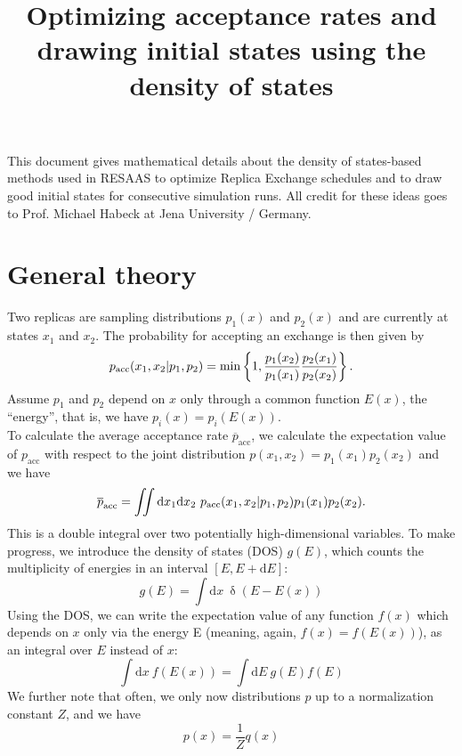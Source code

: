 \documentclass{article}
\title{Optimizing acceptance rates and drawing initial states using the density of states}
\date{}
\renewcommand{\d}{\mathrm{d}}
\begin{document}
\maketitle
This document gives mathematical details about the density of states-based methods used in RESAAS to optimize Replica Exchange schedules and to draw good initial states for consecutive simulation runs. All credit for these ideas goes to Prof. Michael Habeck at Jena University / Germany.
\section*{General theory}
Two replicas are sampling distributions $p_1(x)$ and $p_2(x)$ and are currently at states $x_1$ and $x_2$. The probability for accepting an exchange is then given by
\begin{equation}
  p_{\mathrm{acc}}(x_1, x_2|p_1, p_2) = \mathrm{min}\left\{1, \frac{p_1(x_2)}{p_1(x_1)} \frac{p_2(x_1)}{p_2(x_2)}\right\} \mbox .
\end{equation}
Assume $p_1$ and $p_2$ depend on $x$ only through a common function $E(x)$, the ``energy'', that is, we have $p_i(x)=p_i(E(x))$. \\
To calculate the average acceptance rate $\overline{p}_{\mathrm{acc}}$, we calculate the expectation value of $p_{\mathrm{acc}}$ with respect to the joint distribution $p(x_1, x_2)=p_1(x_1)p_2(x_2)$ and we have
\begin{equation}
  \overline{p}_{\mathrm{acc}} = \iint \d x_1 \d x_2 \ p_{\mathrm{acc}}(x_1, x_2|p_1, p_2) p_1(x_1)p_2(x_2) \mbox .
\end{equation}
This is a double integral over two potentially high-dimensional variables. To make progress, we introduce the density of states (DOS) $g(E)$, which counts the multiplicity of energies in an interval $[E, E + \d E]$:
\begin{equation*}
  g(E) = \int \d x \ \updelta(E-E(x))
\end{equation*}
Using the DOS, we can write the expectation value of any function $f(x)$ which depends on $x$ only via the energy E (meaning, again, $f(x)=f(E(x))$), as an integral over $E$ instead of $x$:
\begin{equation*}
  \int \d x \ f(E(x)) = \int \d E \ g(E) f(E)
\end{equation*}
We further note that often, we only now distributions $p$ up to a normalization constant $Z$, and we have
\begin{equation*}
  p(x) = \frac{1}{Z}q(x)
\end{equation*}
\end{document}
